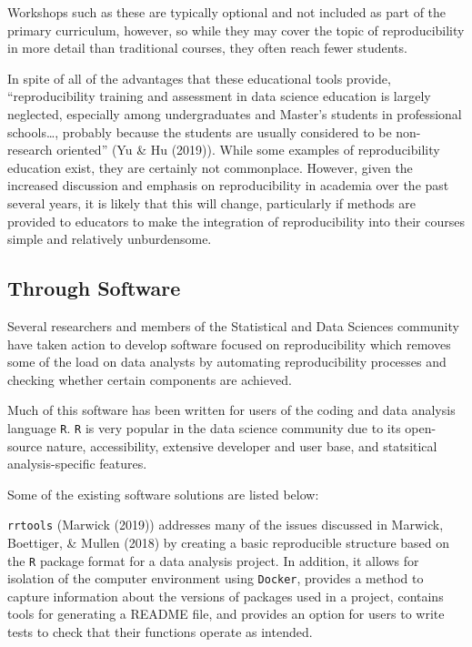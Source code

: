 \documentclass[12pt,twoside]{reedthesis}
\begin{document}
Workshops such as these are typically optional and not included as part of the primary curriculum, however, so while they may cover the topic of reproducibility in more detail than traditional courses, they often reach fewer students.

In spite of all of the advantages that these educational tools provide, ``reproducibility training and assessment in data science education is largely neglected, especially among undergraduates and Master's students in professional schools\ldots, probably because the students are usually considered to be non-research oriented'' (Yu \& Hu (2019)). While some examples of reproducibility education exist, they are certainly not commonplace. However, given the increased discussion and emphasis on reproducibility in academia over the past several years, it is likely that this will change, particularly if methods are provided to educators to make the integration of reproducibility into their courses simple and relatively unburdensome.

\hypertarget{through-software}{%
\subsection{Through Software}\label{through-software}}

Several researchers and members of the Statistical and Data Sciences community have taken action to develop software focused on reproducibility which removes some of the load on data analysts by automating reproducibility processes and checking whether certain components are achieved.

Much of this software has been written for users of the coding and data analysis language \texttt{R}. \texttt{R} is very popular in the data science community due to its open-source nature, accessibility, extensive developer and user base, and statsitical analysis-specific features.

Some of the existing software solutions are listed below:

\texttt{rrtools} (Marwick (2019)) addresses many of the issues discussed in Marwick, Boettiger, \& Mullen (2018) by creating a basic reproducible structure based on the \texttt{R} package format for a data analysis project. In addition, it allows for isolation of the computer environment using \texttt{Docker}, provides a method to capture information about the versions of packages used in a project, contains tools for generating a README file, and provides an option for users to write tests to check that their functions operate as intended.
\end{document}
